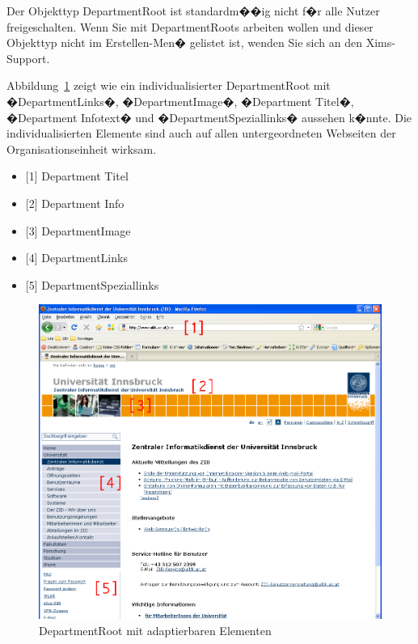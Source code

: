 \begin{Hinweis}
  Der Objekttyp DepartmentRoot ist standardm��ig nicht f�r alle Nutzer freigeschalten. Wenn Sie mit DepartmentRoots arbeiten wollen und dieser Objekttyp nicht im Erstellen-Men� gelistet ist, wenden Sie sich an den Xims-Support.
\end{Hinweis}

Abbildung~\ref{fig:departmentrootzid} zeigt wie ein individualisierter DepartmentRoot mit
�DepartmentLinks�, �DepartmentImage�, �Department Titel�, �Department Infotext�
und �DepartmentSpeziallinks� aussehen k�nnte. Die individualisierten Elemente sind
auch auf allen untergeordneten Webseiten der Organisationseinheit wirksam.

\begin{itemize}
\item {[1] Department Titel}
\item {[2] Department Info}
\item {[3] DepartmentImage}
\item {[4] DepartmentLinks}
\item {[5] DepartmentSpeziallinks}
\end{itemize}

\begin{figure}[!ht]
  \centering
  \includegraphics[width=\textwidth]{./images/departmentroot-zid.png}
  \caption{DepartmentRoot mit adaptierbaren Elementen}
  \label{fig:departmentrootzid}
\end{figure}

